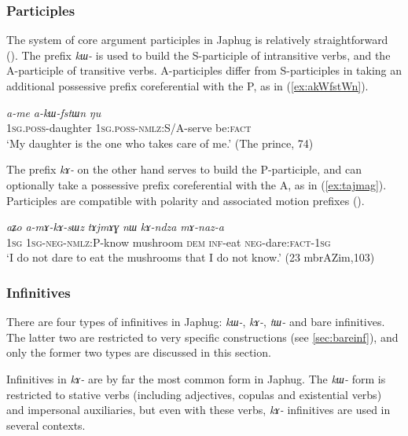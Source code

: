 \documentclass[oneside,a4paper,11pt]{article}
\newcommand{\ipa}[1]{\textit{\phon#1}}
\begin{document}
\subsubsection{Participles} \label{sec:participles}
The system of core argument participles in Japhug is relatively straightforward (\citealt{jacques16relatives}). The prefix \ipa{kɯ-} is used to build the S-participle of intransitive verbs, and the A-participle of transitive verbs. A-participles differ from S-participles in taking an additional possessive prefix coreferential with the P, as in (\ref{ex:akWfstWn}).

\begin{exe}
\ex \label{ex:akWfstWn}
\gll \ipa{a-me} 	\ipa{a-kɯ-fstɯn} 	\ipa{ŋu} \\
\textsc{1sg.poss}-daughter \textsc{1sg.poss}-\textsc{nmlz}:S/A-serve be:\textsc{fact} \\
\glt `My daughter is the one who takes care of me.' (The prince, 74)
\end{exe}

The prefix \ipa{kɤ-} on the other hand serves to build the P-participle, and can optionally take a possessive prefix coreferential with the A, as in (\ref{ex:tajmag}). Participles are compatible with polarity and associated motion prefixes (\citealt{jacques16relatives}).

\begin{exe}
   \ex \label{ex:tajmag}
   \gll
\ipa{aʑo}  	\ipa{a-mɤ-kɤ-sɯz}   	\ipa{tɤjmɤɣ}  	\ipa{nɯ}  	\ipa{kɤ-ndza}  	\ipa{mɤ-naz-a}  \\
\textsc{1sg} \textsc{1sg-neg-nmlz:P}-know mushroom \textsc{dem} \textsc{inf}-eat \textsc{neg}-dare:\textsc{fact}-\textsc{1sg} \\
\glt `I do not dare to eat the mushrooms that I do not know.' (23 mbrAZim,103)
\end{exe}

\subsubsection{Infinitives} \label{sec:infinitives}
There are four types of infinitives in Japhug: \ipa{kɯ-}, \ipa{kɤ-}, \ipa{tɯ-} and bare infinitives. The latter two are restricted to very specific constructions (see \ref{sec:bareinf}), and only the former two types are discussed in this section. 

Infinitives in \ipa{kɤ-} are by far the most common form in Japhug. The \ipa{kɯ-} form is restricted to stative verbs (including adjectives, copulas and existential verbs) and impersonal auxiliaries, but even with these verbs, \ipa{kɤ-} infinitives are used in several contexts. 
\end{document}
